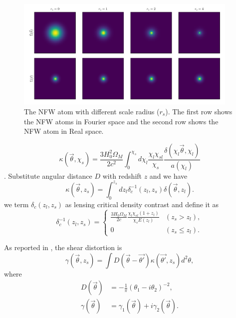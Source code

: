 \documentclass[twocolumn]{aastex62}
\newcommand{\vecb}[1]{{#1}}
\begin{document}
\begin{figure}
 \includegraphics[width=0.95\textwidth]{nfwlet-atom-2D.pdf}
 \caption{The NFW atom with different scale radius ($r_s$). The first row shows the NFW atoms in Fourier space and the second row shows the NFW atom in Real space.}
\end{figure}


\begin{equation}
\kappa(\vec{\theta},\chi_s)=\frac{3H_0^2\Omega_M}{2 c^2} \int_0^{\chi_s} d\chi_l \frac{\chi_l \chi_{sl}}{\chi_s} \frac{\delta(\chi_l \vec{\theta},\chi_l)}{a(\chi_l)}
\end{equation}
\citep{massMap-Glimpse3D2014}.
Substitute angular distance $D$ with redshift $z$ and we have
\begin{equation}\label{eq-delta2kappa}
\kappa(\vec{\theta},z_s)=\int_0^{z_s} dz_l \delta_{c}^{-1}(z_l,z_s)\delta(\vec{\theta},z_l).
\end{equation}
we term $\delta_{c}(z_l,z_s)$ as lensing critical density contrast and define it as
\begin{equation}
\delta_{c}^{-1}(z_l,z_s) =
\begin{cases}
\frac{3H_0\Omega_M}{2 c} \frac{\chi_l \chi_{sl} (1+z_l)}{\chi_{s} E\left(z_l\right)} & (z_s>z_l),\\
0&(z_s \leq z_l).
\end{cases}
\end{equation}

As reported in \citet{massMap-KS1993}, the shear distortion is
\begin{equation}\label{eq-kappa2gamma}
\vecb{\gamma}(\vec{\theta},z_s) = \int \vecb{D}(\vec{\theta}-\vec{\theta'}) \kappa(\vec{\theta'},z_s) d^2 \theta,
\end{equation}
where
\begin{equation}
\begin{split}
\vecb{D}(\vec{\theta})&=-\frac{1}{\pi}(\theta_1-i\theta_2)^{-2},\\
\vecb{\gamma}(\vec{\theta})&=\gamma_1(\vec{\theta})+i\gamma_2(\vec{\theta}).
\end{split}
\end{equation}
\end{document}
